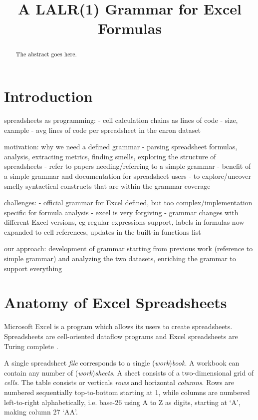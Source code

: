 \documentclass[conference]{IEEEtran}
\begin{document}
\title{A LALR(1) Grammar for Excel Formulas}

\maketitle


\begin{abstract}

The abstract goes here.
\end{abstract}

\IEEEpeerreviewmaketitle


\section{Introduction}

spreadsheets as programming:
- cell calculation chains as lines of code - size, example
- avg lines of code per spreadsheet in the enron dataset

motivation: why we need a defined grammar
- parsing spreadsheet formulas, analysis, extracting metrics, finding smells, exploring the structure of spreadsheets
- refer to papers needing/referring to a simple grammar
- benefit of a simple grammar and documentation for spreadsheet users
- to explore/uncover smelly syntactical constructs that are within the grammar coverage

challenges:
- official grammar for Excel defined, but too complex/implementation specific for formula analysis
- excel is very forgiving
- grammar changes with different Excel versions, eg regular expressions support, labels in formulas now expanded to cell
references, updates in the built-in functions list

our approach:
development of grammar starting from previous work (reference to simple grammar) and analyzing the two datasets, enriching the
grammar to support everything

\section{Anatomy of Excel Spreadsheets}

Microsoft Excel is a program which allows its users to create spreadsheets.
Spreadsheets are cell-oriented dataflow programs and Excel spreadsheets are Turing complete \cite{ExcelTuringComplete}.

A single spreadsheet \emph{file} corresponds to a single (\emph{work})\emph{book}.
A workbook can contain any number of (\emph{work})\emph{sheets}.
A sheet consists of a two-dimensional grid of \emph{cells}.
The table consists or verticals \emph{rows} and horizontal \emph{columns}.
Rows are numbered sequentially top-to-bottom starting at 1, while columns are numbered left-to-right alphabetically, i.e. base-26 using A to Z as digits, starting at `A', making column 27 `AA'.
\end{document}
